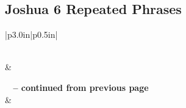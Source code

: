 \subsection{Joshua 6 Repeated Phrases}


\normalsize
 
\begin{center}
\begin{longtable}{|p{3.0in}|p{0.5in}|}
\caption[Joshua 6 Repeated Phrases]{Joshua 6 Repeated Phrases}\label{table:Repeated Phrases Joshua 6} \\
\hline {} &  \\ \hline 
\endfirsthead
 
{{\bfseries \tablename\ \thetable{} -- continued from previous page}} \\  
\hline {} &  \\ \hline 
\endhead
 

\end{longtable}
\end{center}
